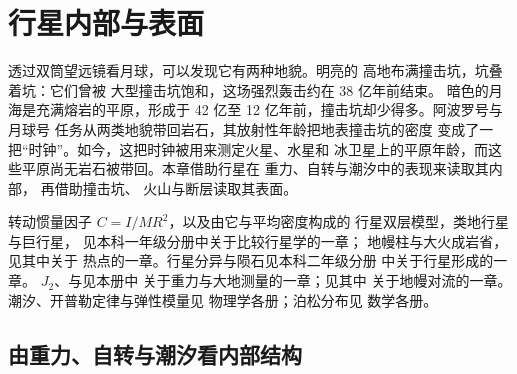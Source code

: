 \chapter{行星内部与表面}\label{ch:b3:planetary-interiors-surfaces}

透过双筒望远镜看月球，可以发现它有两种地貌。明亮的
高地布满撞击坑，坑叠着坑：它们曾被
大型撞击坑饱和，这场强烈轰击约在 38 亿年前结束。
暗色的月海是充满熔岩的平原，形成于 42 亿至
12 亿年前，撞击坑却少得多。阿波罗号与月球号
任务从两类地貌带回岩石，其放射性年龄把地表撞击坑的密度
变成了一把“时钟”。如今，这把时钟被用来测定火星、水星和
冰卫星上的平原年龄，而这些平原尚无岩石被带回。本章借助行星在
重力、自转与潮汐中的表现来读取其内部，
再借助撞击坑、
火山与断层读取其表面。

\begin{recall}
转动惯量因子 $C = I/MR^2$，以及由它与平均密度构成的
行星双层模型，类地行星与巨行星，
见本科一年级分册中关于比较行星学的一章；
地幔柱与大火成岩省，见其中关于
热点的一章。行星分异与陨石见本科二年级分册
中关于行星形成的一章。
$J_2$、与见本册中
关于重力与大地测量的一章；见其中
关于地幔对流的一章。潮汐、开普勒定律与弹性模量见
物理学各册；泊松分布见
数学各册。
\end{recall}

\section{由重力、自转与潮汐看内部结构}\label{sec:b3:planetary-interiors-surfaces:interiors}

